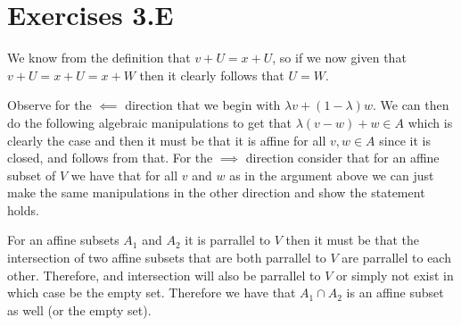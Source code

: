 \documentclass[10pt, twocolumn]{article}
\begin{document}
\section{Exercises 3.E}
\begin{q}[7]
    We know from the definition that $ v + U = x + U $, so if we now given that $ v + U = x + U = x + W $ then it clearly follows that $ U = W $. 
\end{q}
\begin{q}[8]
    Observe for the $ \impliedby $ direction that we begin with $ \lambda v + (1 - \lambda)w $. 
    We can then do the following algebraic manipulations to get that $ \lambda(v-w) + w \in A $ which is clearly the case and then it must be that it is affine for all $ v, w \in A $ since it is closed, and follows from that. 
    For the $ \implies $ direction consider that for an affine subset of $ V $ we have that for all $ v $ and $ w $ as in the argument above we can just make the same manipulations in the other direction and show the statement holds.
\end{q}
\begin{q}[9]
    For an affine subsets $ A_1 $ and $ A_2$  it is parrallel to $ V $ then it must be that the intersection of two affine subsets that are both parrallel to $ V $ are parrallel to each other. 
    Therefore, and intersection will also be parrallel to $ V $ or simply not exist in which case be the empty set. Therefore we have that $A_1 \cap A_2 $ is an affine subset as well (or the empty set). 
\end{q}
\end{document}
